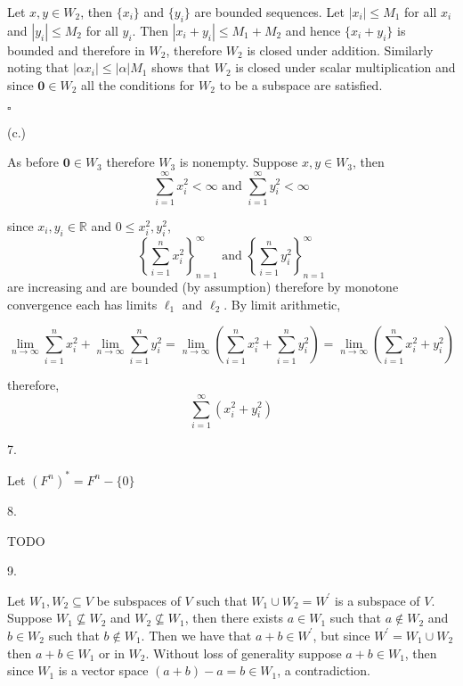 \documentclass[letterpaper,11pt]{article}
\theoremstyle{definition}
\begin{document}
Let $x, y \in W_2$, then $\{x_i\}$ and $\{y_i\}$ are bounded sequences. Let $|x_i| \leq M_1$ for all $x_i$ and $|y_i| \leq M_2$ for all $y_i$. Then $|x_i + y_i| \leq M_1 + M_2$ and hence $\{x_i + y_i\}$ is bounded and therefore in $W_2$, therefore $W_2$ is closed under addition. Similarly noting that $|\alpha x_i| \leq |\alpha|M_1$ shows that $W_2$ is closed under scalar multiplication and since $\textbf{0} \in W_2$ all the conditions for $W_2$ to be a subspace are satisfied. 

\begin{flushright}
	$\square$
\end{flushright}

\begin{flushleft}
	(c.)
\end{flushleft}

As before $\textbf{0} \in W_3$ therefore $W_3$ is nonempty. Suppose $x, y \in W_3$, then $$\sum_{i=1}^\infty x_i^2 < \infty \text{ and }\sum_{i=1}^\infty y_i^2 < \infty$$

since $x_i, y_i \in \mathbb{R}$ and $0 \leq x_i^2, y_i^2$, $$\left\{\sum_{i=1}^n x_i^2\right\}_{n=1}^\infty \text{ and }\left\{\sum_{i=1}^n y_i^2\right\}_{n=1}^\infty$$ are increasing and are bounded (by assumption) therefore by monotone convergence each has limits $\ell_1$ and $\ell_2$. By limit arithmetic,

$$\lim_{n \to \infty} \sum_{i=1}^n x_i^2  + \lim_{n \to \infty} \sum_{i=1}^n y_i^2  = \lim_{n \to \infty}\left(\sum_{i=1}^n x_i^2  +  \sum_{i=1}^n y_i^2\right) = \lim_{n \to \infty}\left(\sum_{i=1}^n x_i^2  + y_i^2\right)$$

therefore, $$\sum_{i=1}^\infty (x_i^2 + y_i^2)$$




\pagebreak

\begin{flushleft}
	7.
\end{flushleft}

Let $(F^n)^* = F^n - \{0\}$



\hrulefill

\begin{flushleft}
	8.
\end{flushleft}
TODO
\hrulefill

\begin{flushleft}
	9.
\end{flushleft}

Let $W_1, W_2 \subseteq V$ be subspaces of $V$ such that $W_1 \cup W_2 = W^\prime$ is a subspace of $V$. Suppose $W_1 \nsubseteq W_2$ and $W_2 \nsubseteq W_1$, then there exists $a \in W_1$ such that $a \notin W_2$ and $b \in W_2$ such that $b \notin W_1$. Then we have that $a + b \in W^\prime$, but since $W^\prime = W_1 \cup W_2$ then $a + b \in W_1$ or in $W_2$. Without loss of generality suppose $a + b \in W_1$, then since $W_1$ is a vector space $(a + b) - a = b \in W_1$, a contradiction. 
\end{document}
